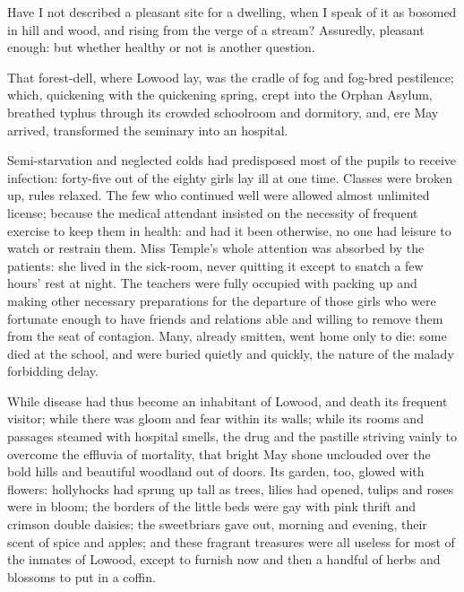 Have I not described a pleasant site for a dwelling, when I speak of it
as bosomed in hill and wood, and rising from the verge of a stream?
Assuredly, pleasant enough: but whether healthy or not is another
question.

That forest-dell, where Lowood lay, was the cradle of fog and fog-bred
pestilence; which, quickening with the quickening spring, crept into the
Orphan Asylum, breathed typhus through its crowded schoolroom and
dormitory, and, ere May arrived, transformed the seminary into an
hospital.

Semi-starvation and neglected colds had predisposed most of the pupils
to receive infection: forty-five out of the eighty girls lay ill at one
time. Classes were broken up, rules relaxed. The few who continued
well were allowed almost unlimited license; because the medical
attendant insisted on the necessity of frequent exercise to keep them in
health: and had it been otherwise, no one had leisure to watch or
restrain them. Miss Temple's whole attention was absorbed by the
patients: she lived in the sick-room, never quitting it except to snatch
a few hours' rest at night. The teachers were fully occupied with
packing up and making other necessary preparations for the departure of
those girls who were fortunate enough to have friends and relations able
and willing to remove them from the seat of contagion. Many, already
smitten, went home only to die: some died at the school, and were buried
quietly and quickly, the nature of the malady forbidding delay.

While disease had thus become an inhabitant of Lowood, and death its
frequent visitor; while there was gloom and fear within its walls; while
its rooms and passages steamed with hospital smells, the drug and the
pastille striving vainly to overcome the effluvia of mortality, that
bright May shone unclouded over the bold hills and beautiful woodland
out of doors. Its garden, too, glowed with flowers: hollyhocks had
sprung up tall as trees, lilies had opened, tulips and roses were in
bloom; the borders of the little beds were gay with pink thrift and
crimson double daisies; the sweetbriars gave out, morning and evening,
their scent of spice and apples; and these fragrant treasures were all
useless for most of the inmates of Lowood, except to furnish now and
then a handful of herbs and blossoms to put in a coffin.

